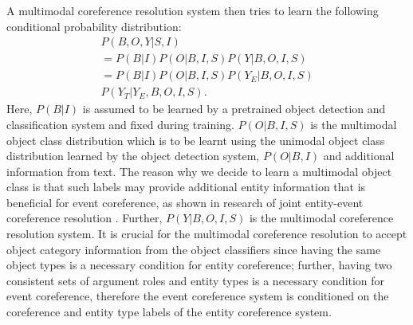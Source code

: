 \documentclass[11pt,a4paper]{article}
\begin{document}
A multimodal coreference resolution system then tries to learn the following conditional probability distribution:
\begin{multline}\label{eq:likelihood}
    P(B, O, Y|S, I)\\ 
    = P(B|I) P(O|B, I, S) P(Y|B, O, I, S)\\
    = P(B|I) P(O|B, I, S) P(Y_E|B, O, I, S)\\ 
    P(Y_T|Y_E, B, O, I, S).
\end{multline}
Here, $P(B|I)$ is assumed to be learned by a pretrained object detection and classification system and fixed during training. $P(O|B, I, S)$ is the multimodal object class distribution which is to be learnt using the unimodal object class distribution learned by the object detection system, $P(O|B, I)$ and additional information from text. The reason why we decide to learn a multimodal object class is that such labels may provide additional entity information that is beneficial for event coreference, as shown in research of joint entity-event coreference resolution \cite{Lee2012-joint-entity-event-coref}. Further, $P(Y|B, O, I, S)$ is the multimodal coreference resolution system. It is crucial for the multimodal coreference resolution to accept object category information from the object classifiers since having the same object types is a necessary condition for entity coreference; further, having two consistent sets of argument roles and entity types is a necessary condition for event coreference, therefore the event coreference system is conditioned on the coreference and entity type labels of the entity coreference system.    
\end{document}
